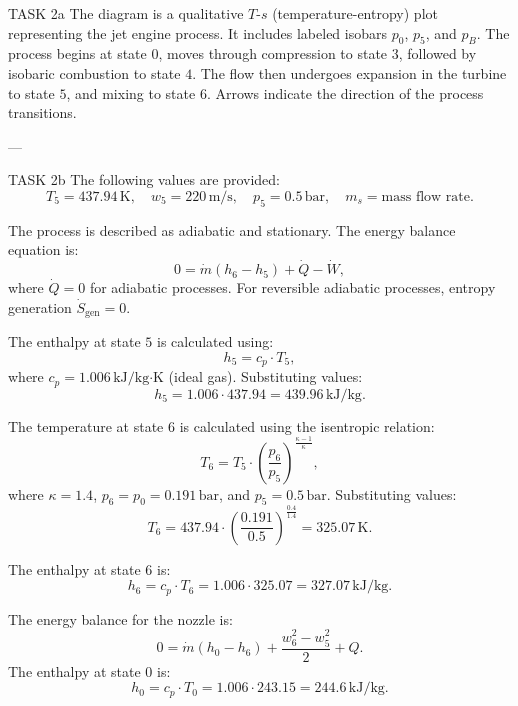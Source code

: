 TASK 2a  
The diagram is a qualitative \( T \)-\( s \) (temperature-entropy) plot representing the jet engine process. It includes labeled isobars \( p_0 \), \( p_5 \), and \( p_B \). The process begins at state \( 0 \), moves through compression to state \( 3 \), followed by isobaric combustion to state \( 4 \). The flow then undergoes expansion in the turbine to state \( 5 \), and mixing to state \( 6 \). Arrows indicate the direction of the process transitions.

---

TASK 2b  
The following values are provided:  
\[
T_5 = 437.94 \, \text{K}, \quad w_5 = 220 \, \text{m/s}, \quad p_5 = 0.5 \, \text{bar}, \quad m_s = \text{mass flow rate}.
\]

The process is described as adiabatic and stationary. The energy balance equation is:  
\[
0 = \dot{m} \left( h_6 - h_5 \right) + \dot{Q} - \dot{W},
\]  
where \( \dot{Q} = 0 \) for adiabatic processes. For reversible adiabatic processes, entropy generation \( \dot{S}_{\text{gen}} = 0 \).

The enthalpy at state \( 5 \) is calculated using:  
\[
h_5 = c_p \cdot T_5,
\]  
where \( c_p = 1.006 \, \text{kJ/kg·K} \) (ideal gas). Substituting values:  
\[
h_5 = 1.006 \cdot 437.94 = 439.96 \, \text{kJ/kg}.
\]

The temperature at state \( 6 \) is calculated using the isentropic relation:  
\[
T_6 = T_5 \cdot \left( \frac{p_6}{p_5} \right)^{\frac{\kappa - 1}{\kappa}},
\]  
where \( \kappa = 1.4 \), \( p_6 = p_0 = 0.191 \, \text{bar} \), and \( p_5 = 0.5 \, \text{bar}. \) Substituting values:  
\[
T_6 = 437.94 \cdot \left( \frac{0.191}{0.5} \right)^{\frac{0.4}{1.4}} = 325.07 \, \text{K}.
\]

The enthalpy at state \( 6 \) is:  
\[
h_6 = c_p \cdot T_6 = 1.006 \cdot 325.07 = 327.07 \, \text{kJ/kg}.
\]

The energy balance for the nozzle is:  
\[
0 = \dot{m} \left( h_0 - h_6 \right) + \frac{w_6^2 - w_5^2}{2} + Q.
\]  
The enthalpy at state \( 0 \) is:  
\[
h_0 = c_p \cdot T_0 = 1.006 \cdot 243.15 = 244.6 \, \text{kJ/kg}.
\]